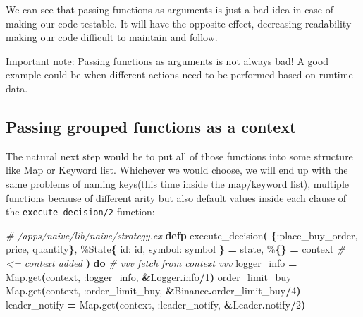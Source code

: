 \documentclass[
  oneside]{book}
\newenvironment{Shaded}{\begin{snugshade}}{\end{snugshade}}
\newcommand{\CommentTok}[1]{\textcolor[rgb]{0.56,0.35,0.01}{\textit{#1}}}
\newcommand{\ConstantTok}[1]{\textcolor[rgb]{0.56,0.35,0.01}{#1}}
\newcommand{\DecValTok}[1]{\textcolor[rgb]{0.00,0.00,0.81}{#1}}
\newcommand{\FunctionTok}[1]{\textcolor[rgb]{0.13,0.29,0.53}{\textbf{#1}}}
\newcommand{\KeywordTok}[1]{\textcolor[rgb]{0.13,0.29,0.53}{\textbf{#1}}}
\newcommand{\NormalTok}[1]{#1}
\newcommand{\OperatorTok}[1]{\textcolor[rgb]{0.81,0.36,0.00}{\textbf{#1}}}
\newcommand{\VariableTok}[1]{\textcolor[rgb]{0.00,0.00,0.00}{#1}}
\begin{document}
We can see that passing functions as arguments is just a bad idea in case of making our code testable. It will have the opposite effect, decreasing readability making our code difficult to maintain and follow.

Important note: Passing functions as arguments is not always bad! A good example could be when different actions need to be performed based on runtime data.

\newpage

\subsection{Passing grouped functions as a context}\label{passing-grouped-functions-as-a-context}

The natural next step would be to put all of those functions into some structure like Map or Keyword list. Whichever we would choose, we will end up with the same problems of naming keys(this time inside the map/keyword list), multiple functions because of different arity but also default values inside each clause of the \texttt{execute\_decision/2} function:

\begin{Shaded}
\begin{Highlighting}[]
\CommentTok{\# /apps/naive/lib/naive/strategy.ex}
  \KeywordTok{defp}\NormalTok{ execute\_decision}\FunctionTok{(}
        \FunctionTok{\{}\VariableTok{:place\_buy\_order}\NormalTok{, price, quantity}\FunctionTok{\}}\NormalTok{,}
\NormalTok{        \%}\ConstantTok{State}\FunctionTok{\{}
          \VariableTok{id:}\NormalTok{ id,}
          \VariableTok{symbol:}\NormalTok{ symbol}
        \FunctionTok{\}} \OperatorTok{=}\NormalTok{ state,}
\NormalTok{        \%}\FunctionTok{\{\}} \OperatorTok{=}\NormalTok{ context }\CommentTok{\# \textless{}= context added}
      \FunctionTok{)} \KeywordTok{do}
    \CommentTok{\# vvv fetch from context vvv}
\NormalTok{    logger\_info }\OperatorTok{=} \ConstantTok{Map}\OperatorTok{.}\NormalTok{get}\FunctionTok{(}\NormalTok{context, }\VariableTok{:logger\_info}\NormalTok{, }\OperatorTok{\&}\ConstantTok{Logger}\OperatorTok{.}\NormalTok{info}\OperatorTok{/}\DecValTok{1}\FunctionTok{)}
\NormalTok{    order\_limit\_buy }\OperatorTok{=} \ConstantTok{Map}\OperatorTok{.}\NormalTok{get}\FunctionTok{(}\NormalTok{context, }\VariableTok{:order\_limit\_buy}\NormalTok{, }\OperatorTok{\&}\ConstantTok{Binance}\OperatorTok{.}\NormalTok{order\_limit\_buy}\OperatorTok{/}\DecValTok{4}\FunctionTok{)}
\NormalTok{    leader\_notify }\OperatorTok{=} \ConstantTok{Map}\OperatorTok{.}\NormalTok{get}\FunctionTok{(}\NormalTok{context, }\VariableTok{:leader\_notify}\NormalTok{, }\OperatorTok{\&}\ConstantTok{Leader}\OperatorTok{.}\NormalTok{notify}\OperatorTok{/}\DecValTok{2}\FunctionTok{)}
\end{Highlighting}
\end{Shaded}
\end{document}
